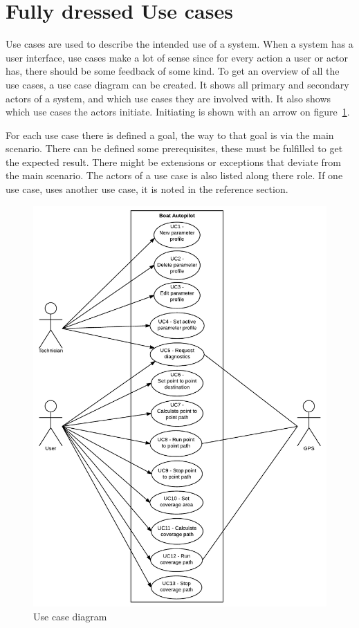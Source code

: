 
\section{Fully dressed Use cases }
\label{sec:usecases}
Use cases are used to describe the intended use of a system. When a system has a user interface, use cases make a lot of sense since for every action a user or actor has, there should be some feedback of some kind. To get an overview of all the use cases, a use case diagram can be created. It shows all primary and secondary actors of a system, and which use cases they are involved with. It also shows which use cases the actors initiate. Initiating is shown with an arrow on figure~\ref{fig:usecasediagram}.

For each use case there is defined a goal, the way to that goal is via the main scenario. There can be defined some prerequisites, these must be fulfilled to get the expected result. There might be extensions or exceptions that deviate from the main scenario. The actors of a use case is also listed along there role. If one use case, uses another use case, it is noted in the reference section.

\begin{figure}[H]
	\centering
	\includegraphics[width=0.9\linewidth]{Images/Requirements_specification/Usecase_diagram}
	\caption{Use case diagram}
	\label{fig:usecasediagram}
\end{figure}

